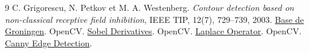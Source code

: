 \begingroup\footnotesize
\renewcommand{\refname}{Références}
\begin{thebibliography}{9}\setlength{\itemsep}{0pt}\setlength{\parskip}{0pt}
 C. Grigorescu, N. Petkov et M. A. Westenberg. \emph{Contour detection based on non-classical receptive field inhibition}, IEEE TIP, 12(7), 729--739, 2003. \href{https://www.cs.rug.nl/~imaging/databases/contour_database/contour_database.html}{Base de Groningen}.
 OpenCV. \href{https://docs.opencv.org/4.x/d2/d2c/tutorial_sobel_derivatives.html}{Sobel Derivatives}.
 OpenCV. \href{https://docs.opencv.org/4.x/d5/db5/tutorial_laplace_operator.html}{Laplace Operator}.
 OpenCV. \href{https://docs.opencv.org/4.x/da/d22/tutorial_py_canny.html}{Canny Edge Detection}.
\end{thebibliography}
\endgroup
